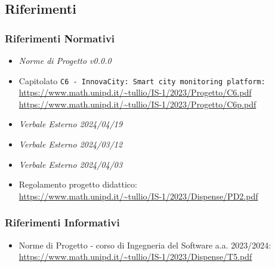 \subsection{Riferimenti}
\subsubsection{Riferimenti Normativi}
\begin{itemize}
	\setlength\itemsep{0em}
	\item \textit{Norme di Progetto v0.0.0}
	\item Capitolato \texttt{C6 - InnovaCity: Smart city monitoring platform:} \\ \url{https://www.math.unipd.it/~tullio/IS-1/2023/Progetto/C6.pdf} \\ \url{https://www.math.unipd.it/~tullio/IS-1/2023/Progetto/C6p.pdf}
	\item \textit{Verbale Esterno 2024/04/19}
    \item \textit{Verbale Esterno 2024/03/12}
	\item \textit{Verbale Esterno 2024/04/03}
	\item Regolamento progetto didattico: \\ \url{https://www.math.unipd.it/~tullio/IS-1/2023/Dispense/PD2.pdf}
\end{itemize}
\subsubsection{Riferimenti Informativi}
\begin{itemize}
	\setlength\itemsep{0em}
	\item Norme di Progetto - corso di Ingegneria del Software a.a. 2023/2024: \\ \url{https://www.math.unipd.it/~tullio/IS-1/2023/Dispense/T5.pdf}
\end{itemize}
\newpage
